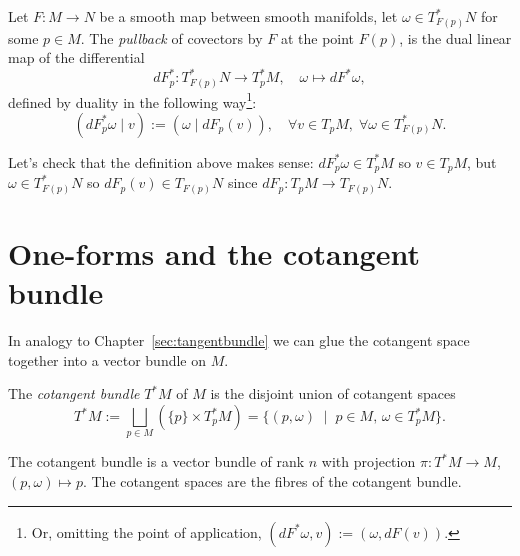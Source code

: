\begin{definition}\label{def:pullback:oneform}
	Let $F:M\to N$ be a smooth map between smooth manifolds, let $\omega\in T^*_{F(p)}N$ for some $p\in M$.
	The \emph{pullback} of covectors by $F$ at the point $F(p)$, is the dual linear map of the differential
	\begin{equation}
		dF^*_p : T^*_{F(p)} N \to T^*_p M, \quad \omega \mapsto dF^*\omega,
	\end{equation}
	defined by duality in the following way\footnote{Or, omitting the point of application, $\left(dF^*\omega, v\right) := \left(\omega, dF(v)\right)$.}:
	\begin{equation}
		\left(dF^*_p\omega \mid v\right) := \left(\omega \mid dF_p(v)\right),\quad
		\forall v\in T_pM,\; \forall \omega\in T^*_{F(p)}N.
	\end{equation}
\end{definition}
\noindent Let's check that the definition above makes sense: $dF^*_p \omega \in T^*_p M$ so $v\in T_p M$, but $\omega\in T^*_{F(p)}N$ so $dF_p(v)\in T_{F(p)}N$ since $dF_p: T_pM\to T_{F(p)}N$.

\section{One-forms and the cotangent bundle}

In analogy to Chapter~\ref{sec:tangentbundle} we can glue the cotangent space together into a vector bundle on $M$.

\begin{definition}
	The \emph{cotangent bundle} $T^*M$ of $M$ is the disjoint union of cotangent spaces
	\begin{equation}
		T^*M := \bigsqcup_{p\in M}\left(\{p\}\times T^*_pM\right)
		= \{(p,\omega) \;\mid\; p\in M,\, \omega\in T^*_pM\}.
	\end{equation}
\end{definition}

The cotangent bundle is a vector bundle of rank $n$ with projection $\pi:T^*M\to M$, $(p,\omega)\mapsto p$.
The cotangent spaces are the fibres of the cotangent bundle.

